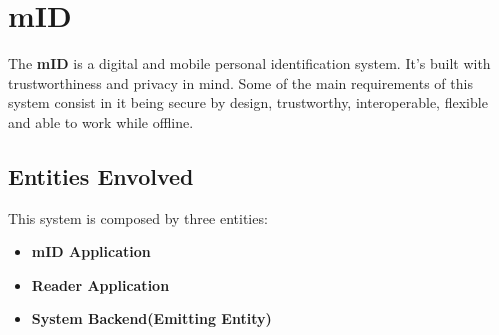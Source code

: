 \section{mID}

The \textbf{mID} is a digital and mobile personal identification system. It's built with trustworthiness and privacy in mind. Some of the main requirements of this system consist in it being secure by design, trustworthy, interoperable, flexible and able to work while offline.

\subsection{Entities Envolved}

This system is composed by three entities:

\begin{itemize}
    \item \textbf{mID Application} 
    \item \textbf{Reader Application}
    \item \textbf{System Backend(Emitting Entity)}
\end{itemize}